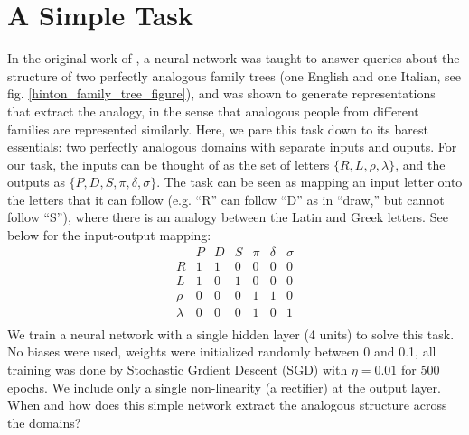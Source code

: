 \documentclass[10pt,letterpaper]{article}
\begin{document}
\section{A Simple Task}
In the original work of \citet{Hinton1986}, a neural network was taught to answer queries about the structure of two perfectly analogous family trees (one English and one Italian, see fig. \ref{hinton_family_tree_figure}), and was shown to generate representations that extract the analogy, in the sense that analogous people from different families are represented similarly. Here, we pare this task down to its barest essentials: two perfectly analogous domains with separate inputs and ouputs. For our task, the inputs can be thought of as the set of letters \(\{R,L,\rho,\lambda\}\), and the outputs as \(\{P,D,S,\pi,\delta,\sigma\}\). The task can be seen as mapping an input letter onto the letters that it can follow (e.g. ``R'' can follow ``D'' as in ``draw,'' but cannot follow ``S''), where there is an analogy between the Latin and Greek letters. See below for the input-output mapping: 
\[
\begin{array}{c|cccccc} 
& P & D & S & \pi & \delta & \sigma \\
\hline
R & 1 & 1 & 0 & 0 & 0 & 0 \\
L & 1 & 0 & 1 & 0 & 0 & 0 \\
\rho & 0 & 0 & 0 & 1 & 1 & 0\\
\lambda & 0 & 0 & 0 & 1 & 0 & 1\\
\end{array} 
\]
We train a neural network with a single hidden layer (4 units) to solve this task. No biases were used, weights were initialized randomly between 0 and 0.1, all training was done by Stochastic Grdient Descent (SGD) with \(\eta = 0.01\) for 500 epochs. We include only a single non-linearity (a rectifier) at the output layer. When and how does this simple network extract the analogous structure across the domains? \par
\end{document}
